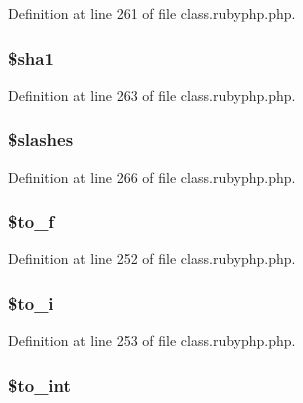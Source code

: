 Definition at line 261 of file class.\-rubyphp.\-php.

\hypertarget{classr_a310d84f0b735d2ab692b4e2acd90e7ef}{
\subsubsection[{\$sha1}]{\setlength{\rightskip}{0pt plus 5cm}\${\bf sha1}}}\label{classr_a310d84f0b735d2ab692b4e2acd90e7ef}


Definition at line 263 of file class.\-rubyphp.\-php.

\hypertarget{classr_ac95fd27a35f2d9674ef3760a4ea1d07f}{
\subsubsection[{\$slashes}]{\setlength{\rightskip}{0pt plus 5cm}\$slashes}}\label{classr_ac95fd27a35f2d9674ef3760a4ea1d07f}


Definition at line 266 of file class.\-rubyphp.\-php.

\hypertarget{classr_a85a2ada0b16d9e59f094e77df5848459}{
\subsubsection[{\$to\-\_\-f}]{\setlength{\rightskip}{0pt plus 5cm}\${\bf to\-\_\-f}}}\label{classr_a85a2ada0b16d9e59f094e77df5848459}


Definition at line 252 of file class.\-rubyphp.\-php.

\hypertarget{classr_afecc47a810cf510aff6387286b9c0e73}{
\subsubsection[{\$to\-\_\-i}]{\setlength{\rightskip}{0pt plus 5cm}\${\bf to\-\_\-i}}}\label{classr_afecc47a810cf510aff6387286b9c0e73}


Definition at line 253 of file class.\-rubyphp.\-php.

\hypertarget{classr_a41eb7bfd09e3b6ad118551accfaad638}{
\subsubsection[{\$to\-\_\-int}]{\setlength{\rightskip}{0pt plus 5cm}\${\bf to\-\_\-int}}}\label{classr_a41eb7bfd09e3b6ad118551accfaad638}


